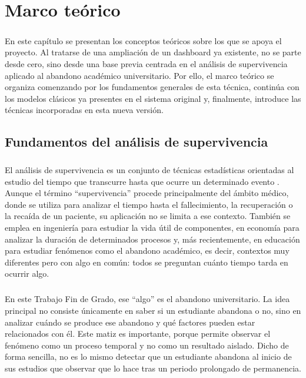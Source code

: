\chapter{Marco teórico}
\label{ch:marco_teorico}

\paragraph*{}En este capítulo se presentan los conceptos teóricos sobre los que se apoya el proyecto. Al tratarse de una ampliación de un dashboard ya existente, no se parte desde cero, sino desde una base previa centrada en el análisis de supervivencia aplicado al abandono académico universitario. Por ello, el marco teórico se organiza comenzando por los fundamentos generales de esta técnica, continúa con los modelos clásicos ya presentes en el sistema original y, finalmente, introduce las técnicas incorporadas en esta nueva versión.

\section{Fundamentos del análisis de supervivencia}
\paragraph*{}El análisis de supervivencia es un conjunto de técnicas estadísticas orientadas al estudio del tiempo que transcurre hasta que ocurre un determinado evento \cite{clark2003survival}. Aunque el término ``supervivencia'' procede principalmente del ámbito médico, donde se utiliza para analizar el tiempo hasta el fallecimiento, la recuperación o la recaída de un paciente, su aplicación no se limita a ese contexto. También se emplea en ingeniería para estudiar la vida útil de componentes, en economía para analizar la duración de determinados procesos y, más recientemente, en educación para estudiar fenómenos como el abandono académico, es decir, contextos muy diferentes pero con algo en común: todos se preguntan cuánto tiempo tarda en ocurrir algo.

\paragraph*{}En este Trabajo Fin de Grado, ese ``algo'' es el abandono universitario. La idea principal no consiste únicamente en saber si un estudiante abandona o no, sino en analizar cuándo se produce ese abandono y qué factores pueden estar relacionados con él. Este matiz es importante, porque permite observar el fenómeno como un proceso temporal y no como un resultado aislado. Dicho de forma sencilla, no es lo mismo detectar que un estudiante abandona al inicio de sus estudios que observar que lo hace tras un periodo prolongado de permanencia.


